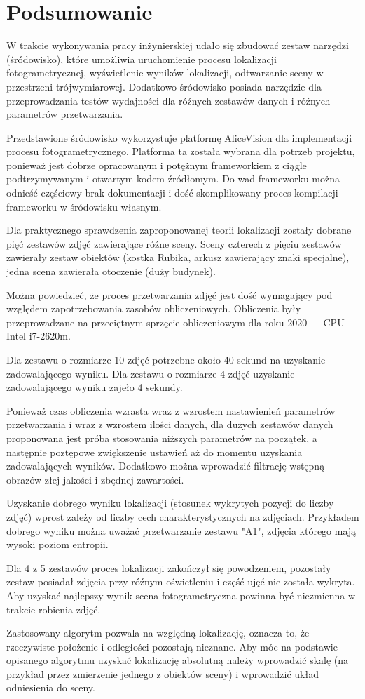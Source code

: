 \chapter{Podsumowanie}

W trakcie wykonywania pracy inżynierskiej udało się zbudować zestaw narzędzi (śródowisko), które umożliwia uruchomienie procesu lokalizacji fotogrametrycznej, wyświetlenie wyników lokalizacji, odtwarzanie sceny w przestrzeni trójwymiarowej. Dodatkowo śródowisko posiada narzędzie dla przeprowadzania testów wydajności dla róźnych zestawów danych i róźnych parametrów przetwarzania.

Przedstawione śródowisko wykorzystuje platformę AliceVision dla implementacji procesu fotogrametrycznego.
Platforma ta została wybrana dla potrzeb projektu, ponieważ jest dobrze opracowanym i potężnym frameworkiem z ciągle podtrzymywanym i otwartym kodem źródłomym.
Do wad frameworku można odnieść częściowy brak dokumentacji i dość skomplikowany proces kompilacji frameworku w śródowisku własnym.

Dla praktycznego sprawdzenia zaproponowanej teorii lokalizacji zostały dobrane pięć zestawów zdjęć zawierające róźne sceny.
Sceny czterech z pięciu zestawów zawierały zestaw obiektów (kostka Rubika, arkusz zawierający znaki specjalne), jedna scena zawierała otoczenie (duży budynek).


Można powiedzieć, że proces przetwarzania zdjęć jest dość wymagający pod względem zapotrzebowania zasobów obliczeniowych.
Obliczenia były przeprowadzane na przeciętnym sprzęcie obliczeniowym dla roku 2020 --- CPU Intel i7-2620m.

Dla zestawu o rozmiarze 10 zdjęć potrzebne około 40 sekund na uzyskanie zadowalającego wyniku.
Dla zestawu o rozmiarze 4 zdjęć uzyskanie zadowalającego wyniku zajeło 4 sekundy.

Ponieważ czas obliczenia wzrasta wraz z wzrostem nastawienień parametrów przetwarzania i wraz z wzrostem ilości danych, dla dużych zestawów danych proponowana jest próba stosowania niższych parametrów na początek, a następnie poztępowe zwiększenie ustawień aż do momentu uzyskania zadowalających wyników. Dodatkowo można wprowadzić filtrację wstępną obrazów złej jakości i zbędnej zawartości.

Uzyskanie dobrego wyniku lokalizacji (stosunek wykrytych pozycji do liczby zdjęć) wprost zależy od liczby cech charakterystycznych na zdjęciach.
Przykładem dobrego wyniku można uważać przetwarzanie zestawu "A1", zdjęcia którego mają wysoki poziom entropii.


Dla 4 z 5 zestawów proces lokalizacji zakończył się powodzeniem, pozostały zestaw posiadał zdjęcia przy róźnym oświetleniu i część ujęć nie została wykryta. Aby uzyskać najlepszy wynik scena fotogrametryczna powinna być niezmienna w trakcie robienia zdjęć.

Zastosowany algorytm pozwala na względną lokalizację, oznacza to, że rzeczywiste położenie i odległości pozostają nieznane. Aby móc na podstawie opisanego algorytmu uzyskać lokalizację absolutną należy wprowadzić skalę (na przykład przez zmierzenie jednego z obiektów sceny) i wprowadzić układ odniesienia do sceny.
